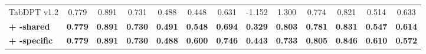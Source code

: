 \begin{table}[H]
\begin{table}[H]
\begin{tabular}{@{}l*{12}{c}@{}}
    \midrule
    TabDPT v1.2 & 0.779 & 0.891 & 0.731 & 0.488 & 0.448 & 0.631 & -1.152 & 1.300 & 0.774 & 0.821 & 0.514 & 0.633 \\
    \rowcolor{tabaceSharedRow}
    \textcolor{tabaceSharedText}{\textbf{+ \method{}-shared}} & \textcolor{tabaceSharedText}{\textbf{0.779}} & \textcolor{tabaceSharedText}{\textbf{0.891}} & \textcolor{tabaceSharedText}{\textbf{0.730}} & \textcolor{tabaceSharedText}{\textbf{0.491}} & \textcolor{tabaceSharedText}{\textbf{0.548}} & \textcolor{tabaceSharedText}{\textbf{0.694}} & \textcolor{tabaceSharedText}{\textbf{0.329}} & \textcolor{tabaceSharedText}{\textbf{0.803}} & \textcolor{tabaceSharedText}{\textbf{0.781}} & \textcolor{tabaceSharedText}{\textbf{0.831}} & \textcolor{tabaceSharedText}{\textbf{0.547}} & \textcolor{tabaceSharedText}{\textbf{0.614}} \\
    \rowcolor{tabaceSpecificRow}
    \textcolor{tabaceSpecificText}{\textbf{+ \method{}-specific}} & \textcolor{tabaceSpecificText}{\textbf{0.779}} & \textcolor{tabaceSpecificText}{\textbf{0.891}} & \textcolor{tabaceSpecificText}{\textbf{0.730}} & \textcolor{tabaceSpecificText}{\textbf{0.488}} & \textcolor{tabaceSpecificText}{\textbf{0.600}} & \textcolor{tabaceSpecificText}{\textbf{0.746}} & \textcolor{tabaceSpecificText}{\textbf{0.443}} & \textcolor{tabaceSpecificText}{\textbf{0.733}} & \textcolor{tabaceSpecificText}{\textbf{0.805}} & \textcolor{tabaceSpecificText}{\textbf{0.846}} & \textcolor{tabaceSpecificText}{\textbf{0.610}} & \textcolor{tabaceSpecificText}{\textbf{0.572}} \\
    \bottomrule
  \end{tabular}
\ifdefined\ICLRLayout
\end{table}
\else
\end{table}
\fi
